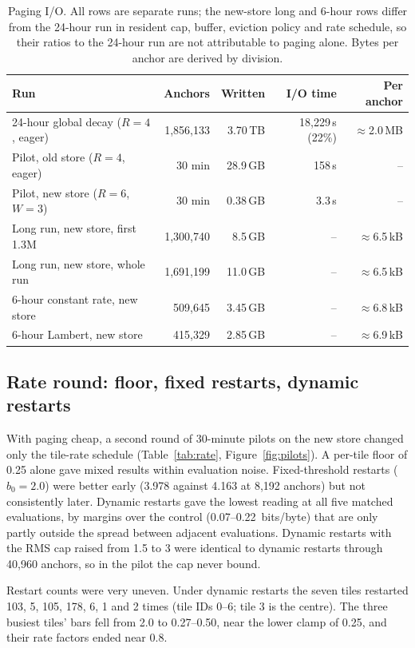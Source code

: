 \documentclass[10pt]{article}
\newcommand{\bpb}{bits/byte}
\begin{document}
\begin{table}[t]
\centering
\caption{Paging I/O. All rows are separate runs; the new-store long and 6-hour rows differ
from the 24-hour run in resident cap, buffer, eviction policy and rate schedule, so their ratios to the
24-hour run are not attributable to paging alone. Bytes per anchor are derived by division.}
\label{tab:io}
\small
\begin{tabular}{lrrrr}
\toprule
Run & Anchors & Written & I/O time & Per anchor \\
\midrule
24-hour global decay ($R=4$, eager) & 1,856,133 & 3.70\,TB & 18,229\,s (22\%) & $\approx$2.0\,MB \\
Pilot, old store ($R=4$, eager) & 30 min & 28.9\,GB & 158\,s & -- \\
Pilot, new store ($R=6$, $W=3$) & 30 min & 0.38\,GB & 3.3\,s & -- \\
Long run, new store, first 1.3M & 1,300,740 & 8.5\,GB & -- & $\approx$6.5\,kB \\
Long run, new store, whole run & 1,691,199 & 11.0\,GB & -- & $\approx$6.5\,kB \\
6-hour constant rate, new store & 509,645 & 3.45\,GB & -- & $\approx$6.8\,kB \\
6-hour Lambert, new store & 415,329 & 2.85\,GB & -- & $\approx$6.9\,kB \\
\bottomrule
\end{tabular}
\end{table}

\subsection{Rate round: floor, fixed restarts, dynamic restarts}
\label{sec:rate}

With paging cheap, a second round of 30-minute pilots on the new store changed only the tile-rate
schedule (Table~\ref{tab:rate}, Figure~\ref{fig:pilots}). A per-tile floor of 0.25 alone gave mixed
results within evaluation noise. Fixed-threshold restarts ($b_0=2.0$) were better early (3.978 against
4.163 at 8,192 anchors) but not consistently later. Dynamic restarts gave the lowest reading at all
five matched evaluations, by margins over the control (0.07--0.22~\bpb) that are only partly outside
the spread between adjacent evaluations. Dynamic restarts with the RMS cap raised from 1.5 to 3 were identical to dynamic restarts
through 40,960 anchors, so in the pilot the cap never bound.

Restart counts were very uneven. Under dynamic restarts the seven tiles restarted 103, 5, 105, 178, 6,
1 and 2 times (tile IDs 0--6; tile 3 is the centre). The three busiest tiles' bars fell from 2.0 to
0.27--0.50, near the lower clamp of 0.25, and their rate factors ended near 0.8.
\end{document}
